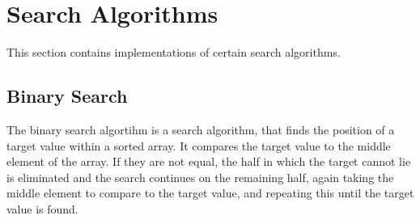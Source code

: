 
\section{Search Algorithms}

This section contains implementations of certain search algorithms.


\subsection{Binary Search}

The binary search algortihm is a search algorithm, that finds the position of a target value within a sorted array.
It compares the target value to the middle element of the array.
If they are not equal, the half in which the target cannot lie is eliminated and the search continues on the remaining half, again taking the middle element to compare to the target value, and repeating this until the target value is found.


